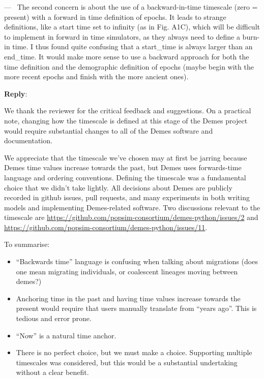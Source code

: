 \documentclass[11pt]{article}
\newcounter{reviewer}
\newcounter{point}[reviewer]
\renewcommand{\thepoint}{\thereviewer.\arabic{point}}
\newenvironment{point}
   {\refstepcounter{point} \bigskip \noindent {\textbf{Reviewer~Point~\thepoint} } ---\ }
   {\par }
\newenvironment{reply}
   {\medskip \noindent \begin{sf}\textbf{Reply}:\  }
   {\medskip \end{sf}}
\begin{document}
\begin{point}
The second concern is about the use of a backward-in-time timescale (zero =
present) with a forward in time definition of epochs. It leads to strange
definitions, like a start time set to infinity (as in Fig. A1C), which will be
difficult to implement in forward in time simulators, as they always need to
define a burn-in time. I thus found quite confusing that a start\_time is always
larger than an end\_time. It would make more sense to use a backward approach
for both the time definition and the demographic definition of epochs (maybe
begin with the more recent epochs and finish with the more ancient ones).
\end{point}
\begin{reply}

We thank the reviewer for the critical feedback and suggestions.
On a practical note, changing how the timescale is defined
at this stage of the Demes project would require substantial changes
to all of the Demes software and documentation.

We appreciate that the timescale we've chosen may at first be jarring
because Demes time values increase towards the past, but Demes uses
forwards-time language and ordering conventions.
Defining the timescale was a fundamental choice that we didn't take lightly.
All decisions about Demes are publicly recorded in github issues,
pull requests, and many experiments in both writing models and implementing
Demes-related software.
Two discussions relevant to the timescale are
\url{https://github.com/popsim-consortium/demes-python/issues/2}
and
\url{https://github.com/popsim-consortium/demes-python/issues/11}.

To summarise:
\begin{itemize}
\item
``Backwards time'' language is confusing when talking about migrations
(does one mean migrating individuals, or coalescent lineages moving
between demes?)
\item
Anchoring time in the past and having time values increase towards
the present would require that users manually translate from ``years ago''.
This is tedious and error prone.
\item
``Now'' is a natural time anchor.
\item
There is no perfect choice, but we must make a choice.
Supporting multiple timescales was considered, but this would be a
substantial undertaking without a clear benefit.
\end{itemize}


\end{reply}
\end{document}
